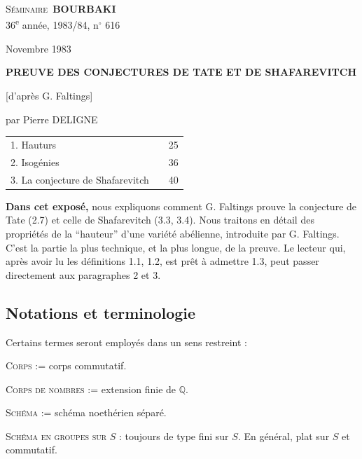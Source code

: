 \documentclass[12pt,a4paper]{article}
\theoremstyle{plain}
\theoremstyle{definition}
\theoremstyle{remark}
\newcommand{\QQ}{\mathbb{Q}}
\providecommand{\QQ}{\mathbb{Q}}
\begin{document}
\thispagestyle{empty}
\begin{center}
{\Large\scshape Séminaire\ \textbf{BOURBAKI}}\\[6pt]
{\small 36\textsuperscript{e} année, 1983/84, n$^\circ$ 616}\par
\vspace{6pt}
{Novembre 1983}\par
\vspace{24pt}
{\Large\bfseries PREUVE DES CONJECTURES DE TATE ET DE SHAFAREVITCH}\par
\vspace{6pt}
{\large [d'après G. Faltings]}\par
\vspace{12pt}
{\large par Pierre DELIGNE}\par
\end{center}

\vspace{12pt}
\begin{tabular}{@{}llr@{}}
1. Hauturs & \dotfill & 25\\
2. Isogénies & \dotfill & 36\\
3. La conjecture de Shafarevitch & \dotfill & 40\\
\end{tabular}

\vspace{12pt}
\textbf{Dans cet exposé,} nous expliquons comment G. Faltings prouve la conjecture de Tate (2.7) et celle de Shafarevitch (3.3, 3.4). Nous traitons en détail des propriétés de la ``hauteur'' d'une variété abélienne, introduite par G. Faltings. C'est la partie la plus technique, et la plus longue, de la preuve. Le lecteur qui, après avoir lu les définitions 1.1, 1.2, est prêt à admettre 1.3, peut passer directement aux paragraphes 2 et 3.

\subsection*{Notations et terminologie}

Certains termes seront employés dans un sens restreint :

\textsc{Corps} := corps commutatif.

\textsc{Corps de nombres} := extension finie de $\QQ$.

\textsc{Schéma} := schéma noethérien séparé.

\textsc{Schéma en groupes sur} $S$ : toujours de type fini sur $S$. En général, plat sur $S$ et commutatif.
\end{document}
